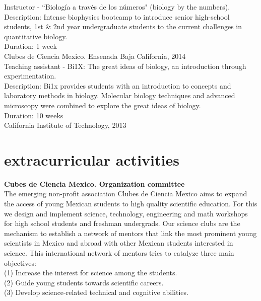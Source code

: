 \documentclass[]{friggeri-cv}
\begin{document}
Instructor - ``Biolog\'{i}a a trav\'{e}s de los n\'{u}meros" (biology by the numbers).\\
Description: Intense biophysics bootcamp to introduce senior high-school students, 1st \& 2nd year undergraduate students to the current challenges in quantitative biology.\\
Duration: 1 week\\
{Clubes de Ciencia Mexico. Ensenada Baja California, 2014}\\

Teaching assistant - Bi1X: The great ideas of biology, an introduction through experimentation.\\
Description: Bi1x provides students with an introduction to concepts and laboratory methods in biology. Molecular biology techniques and advanced microscopy were combined to explore the great ideas of biology.\\
Duration: 10 weeks\\
{California Institute of Technology, 2013}\\

\section{extracurricular activities}
\textbf{Cubes de Ciencia Mexico. Organization committee}\\
The emerging non-profit association Clubes de Ciencia Mexico aims to expand the access of young Mexican students to high quality scientific education. For this we design and implement science, technology, engineering and math workshops for high school students and freshman undergrads. Our science clubs are the mechanism to establish a network of mentors that link the most prominent young scientists in Mexico and abroad with other Mexican students interested in science. This international network of mentors tries to catalyze three main objectives:\\
(1) Increase the interest for science among the students.\\
(2) Guide young students towards scientific careers.\\
(3) Develop science-related technical and cognitive abilities.

\newpage 
\end{document}
